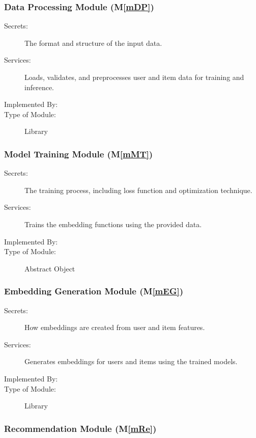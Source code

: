 \documentclass[12pt, titlepage]{article}
\newcommand{\mref}[1]{M\ref{#1}}
\begin{document}
\subsubsection{Data Processing Module (\mref{mDP})}

\begin{description}
\item[Secrets:]The format and structure of the input data.
\item[Services:]Loads, validates, and preprocesses user and item data for training and inference.
\item[Implemented By:] \progname
\item[Type of Module:] Library
\end{description}

\subsubsection{Model Training Module (\mref{mMT})}

\begin{description}
\item[Secrets:]The training process, including loss function and optimization technique.
\item[Services:]Trains the embedding functions using the provided data.
\item[Implemented By:] \progname
\item[Type of Module:] Abstract Object
\end{description}

\subsubsection{Embedding Generation Module (\mref{mEG})}

\begin{description}
\item[Secrets:]How embeddings are created from user and item features.
\item[Services:]Generates embeddings for users and items using the trained models.
\item[Implemented By:] \progname
\item[Type of Module:] Library
\end{description}

\subsubsection{Recommendation Module (\mref{mRe})}
\end{document}
